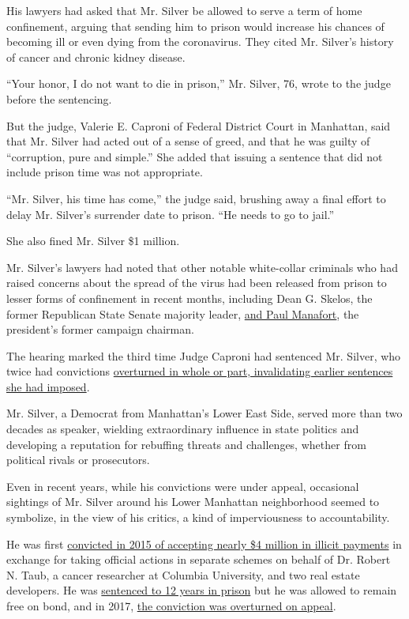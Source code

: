 His lawyers had asked that Mr. Silver be allowed to serve a term of home
confinement, arguing that sending him to prison would increase his
chances of becoming ill or even dying from the coronavirus. They cited
Mr. Silver's history of cancer and chronic kidney disease.

``Your honor, I do not want to die in prison,'' Mr. Silver, 76, wrote to
the judge before the sentencing.

But the judge, Valerie E. Caproni of Federal District Court in
Manhattan, said that Mr. Silver had acted out of a sense of greed, and
that he was guilty of ``corruption, pure and simple.'' She added that
issuing a sentence that did not include prison time was not appropriate.

``Mr. Silver, his time has come,'' the judge said, brushing away a final
effort to delay Mr. Silver's surrender date to prison. ``He needs to go
to jail.''

She also fined Mr. Silver \$1 million.

Mr. Silver's lawyers had noted that other notable white-collar criminals
who had raised concerns about the spread of the virus had been released
from prison to lesser forms of confinement in recent months, including
Dean G. Skelos, the former Republican State Senate majority leader,
\href{https://www.nytimes.com/2020/05/13/us/politics/paul-manafort-released-coronavirus.html}{and
Paul Manafort}, the president's former campaign chairman.

The hearing marked the third time Judge Caproni had sentenced Mr.
Silver, who twice had convictions
\href{https://www.nytimes.com/2020/01/21/nyregion/sheldon-silver-appeal.html}{overturned
in whole or part, invalidating earlier sentences she had imposed}.

Mr. Silver, a Democrat from Manhattan's Lower East Side, served more
than two decades as speaker, wielding extraordinary influence in state
politics and developing a reputation for rebuffing threats and
challenges, whether from political rivals or prosecutors.

Even in recent years, while his convictions were under appeal,
occasional sightings of Mr. Silver around his Lower Manhattan
neighborhood seemed to symbolize, in the view of his critics, a kind of
imperviousness to accountability.

He was first
\href{https://www.nytimes.com/2015/12/01/nyregion/sheldon-silver-guilty-corruption-trial.html}{convicted
in 2015 of accepting nearly \$4 million in illicit payments} in exchange
for taking official actions in separate schemes on behalf of Dr. Robert
N. Taub, a cancer researcher at Columbia University, and two real estate
developers. He was
\href{https://www.nytimes.com/2016/05/04/nyregion/sheldon-silver-ex-new-york-assembly-speaker-gets-12-year-prison-sentence.html}{sentenced
to 12 years in prison} but he was allowed to remain free on bond, and in
2017,
\href{https://www.nytimes.com/2017/07/13/nyregion/sheldon-silvers-conviction-is-overturned.html}{the
conviction was overturned on appeal}.

